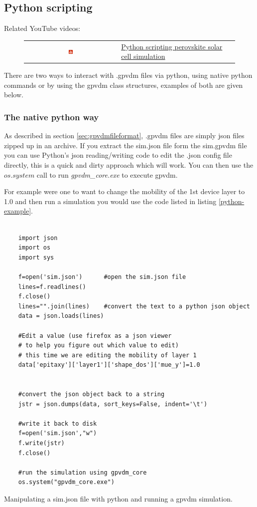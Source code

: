 \subsection{Python scripting}
\label{sec:pythonscripts}
Related YouTube videos:
\begin{figure}

\begin{tabular}{ c l }

\includegraphics[width=0.05\textwidth]{./images/youtube.png}

&
\href{https://www.youtube.com/watch?v=vyeAzxBZjMg}{Python scripting perovskite solar cell simulation}

\end{tabular}
\end{figure}

There are two ways to interact with .gpvdm files via python, using native python commands or by using the gpvdm class structures, examples of both are given below.


\subsubsection{The native python way}
As described in section \ref{sec:gpvdmfileformat}, .gpvdm files are simply json files zipped up in an archive. If you extract the sim.json file form the sim.gpvdm file you can use Python's json reading/writing code to edit the .json config file directly, this is a quick and dirty approach which will work. You can then use the $os.system$ call to run \emph{gpvdm\_core.exe} to execute gpvdm.

For example were one to want to change the mobility of the 1st device layer to 1.0 and then run a simulation you would use the code listed in listing \ref{python-example}.

\begin{listing}
\begin{verbatim}

	import json
	import os
	import sys

	f=open('sim.json')		#open the sim.json file
	lines=f.readlines()
	f.close()
	lines="".join(lines)	#convert the text to a python json object
	data = json.loads(lines)

	#Edit a value (use firefox as a json viewer
	# to help you figure out which value to edit)
	# this time we are editing the mobility of layer 1
	data['epitaxy']['layer1']['shape_dos']['mue_y']=1.0


	#convert the json object back to a string
	jstr = json.dumps(data, sort_keys=False, indent='\t')

	#write it back to disk
	f=open('sim.json',"w")
	f.write(jstr)
	f.close()

	#run the simulation using gpvdm_core
	os.system("gpvdm_core.exe")
\end{verbatim}
\caption{Manipulating a sim.json file with python and running a gpvdm simulation.} 
\label{python-example}
\end{listing}

